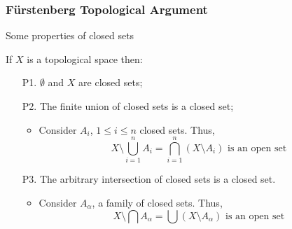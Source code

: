 \documentclass[10pt]{beamer}
\begin{document}
\begin{frame}
\frametitle{F\"{u}rstenberg Topological Argument}

\begin{block}{Some properties of closed sets}


  If $X$ is a topological space then:
  \begin{itemize}
    \item[P1.]$\emptyset$ and $X$ are closed sets; 
    \item[P2.] The finite union of closed sets is a closed set;
      \begin{itemize}
      \item  Consider $A_i$, $1 \leq i \leq n$ closed sets. Thus,
        $$X\setminus \displaystyle \bigcup_{i=1}^n A_i = \bigcap_{i=1}^n(X \setminus A_i) \mbox{ is an open set}$$
        \end{itemize}
      \item[P3.] The arbitrary intersection of closed sets is a closed set.
        \begin{itemize}
      \item  Consider $A_{\alpha}$, a family of closed sets. Thus,
        $$X\setminus \displaystyle \bigcap A_{\alpha}= \bigcup(X \setminus A_{\alpha}) \mbox{ is an open set}$$
        \end{itemize}
    \end{itemize}
\end{block}

 \end{frame}  
\end{document}
